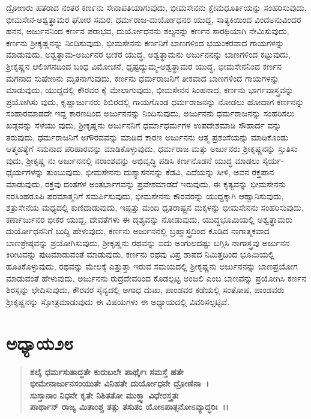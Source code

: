 ದ್ರೋಣರು ಹತರಾದ ನಂತರ ಕಣ೯ನು ಸೇನಾಪತಿಯಾಗುವುದು, ಭೀಮಸೇನನು ಕ್ಷೇಮಧೂರ್ತಿಯನ್ನು ಸಂಹರಿಸುವುದು, ಭೀಮಸೇನ-ಅಶ್ವತ್ಥಾಮರ ಘೋರ ಸಮರ, ಧರ್ಮರಾಜ-ದುರ್ಯೋಧನರ ಯುದ್ದ, ಸಾತ್ಯಕಿಯಿಂದ ವಿಂದಅನುವಿಂದರ ಹನನ, ಅರ್ಜುನನಿಂದ ಕರ್ಣನ ಪರಾಭವ, ದುರ್ಯೋಧನನು ಶಲ್ಯನನ್ನು ಕರ್ಣನ ಸಾರಥಿಯಾಗಿ ನೇಮಿಸುವುದು, ಕರ್ಣನು ಶ‍್ರೀಕೃಷ್ಣನನ್ನು ನಿಂದಿಸುವುದು, ಭೀಮಸೇನನು ಕರ್ಣನಿಗೆ ಬಾಣಗಳಿಂದ ಭಯಂಕರವಾದ ಗಾಯಗಳನ್ನು ಮಾಡುವುದು, ಅಶ್ವತ್ಥಾಮ-ಅರ್ಜುನರ ಭೀಕರ ಯುದ್ಧ, ಅಶ್ವತ್ಥಾಮನು ಅರ್ಜುನನನ್ನು ಬಾಣಗಳಿಂದ ಕಟ್ಟುವುದು, ಶ‍್ರೀಕೃಷ್ಣನ ಆಲಿಂಗನದಿಂದ ಬಂಧ ವಿಮೋಚನೆ, ಧೃಷ್ಟದ್ಯುಮ್ಮ-ಅಶ್ವತ್ಥಾಮರ ಯುದ್ಧ, ಭೀಮಸೇನನಿಂದ ಕರ್ಣನ ಮಗನಾದ ಸುಷೇಣನು ಮೃತನಾಗುವುದು, ಕರ್ಣನು ಧರ್ಮರಾಜನಿಗೆ ತೀಕವಾದ ಬಾಣಗಳಿಂದ ಗಾಯಗಳನ್ನು ಮಾಡುವುದು, ಯುದ್ದದಲ್ಲಿ ಕೌರವರ ಕೈ ಮೇಲಾಗುವುದು, ಭೀಮಸೇನನ ಸಿಂಹನಾದ, ಕರ್ಣನು ಭಾರ್ಗವಾಸ್ತ್ರವನ್ನು ಪ್ರಯೋಗಿಸು ವುದು, ಕೃಷ್ಣಾರ್ಜುನರು ಶಿಬಿರದಲ್ಲಿ ಗಾಯಗೊಂಡ ಧರ್ಮರಾಜನನ್ನು ನೋಡಲು ಹೋದಾಗ ಕರ್ಣನನ್ನು ಸಂಹಾರಮಾಡದೇ ಇದ್ದ ಕಾರಣದಿಂದ ಅರ್ಜುನನನ್ನು ನಿಂದಿಸುವುದು, ಅರ್ಜುನನು ಧರ್ಮರಾಜನನ್ನು ಸಂಹರಿಸಲು ಖಡ್ಗವನ್ನು ಸೆಳೆಯು ವುದು, ಶ‍್ರೀಕೃಷ್ಣನು ಅರ್ಜುನನಿಗೆ ಧರ್ಮಾಧರ್ಮಗಳ ಉಪದೇಶಮಾಡಿ ಸೌಹಾರ್ದ ವನ್ನು ತರುವುದು, ಧರ್ಮರಾಜನಿಗೆ ಅಗೌರವವನ್ನು ಮಾಡಿದ ಕಾರಣ ಅರ್ಜುನನು ಆತ್ಮ ಪ್ರಶಂಸೆಯನ್ನು ಮಾಡಿಕೊಂಡು ಆತ್ಮಹತ್ಯೆಗೆ ಸಮನಾದ ಪರಿಹಾರವನ್ನು ಮಾಡಿಕೊಳ್ಳುವುದು, ಧರ್ಮರಾಜ ಮತ್ತು ಅರ್ಜುನರು ಶ‍್ರೀಕೃಷ್ಣನನ್ನು ಸ್ತುತಿಸು ವುದು, ಶ‍್ರೀಕೃಷ್ಣ ನು ಅರ್ಜುನನಲ್ಲಿ ನರಾಂಶವನ್ನು ಅಭಿವೃದ್ಧಿ ಪಡಿಸಿ ಕರ್ಣನೊಡನೆ ಯುದ್ಧ ಮಾಡಲು ಸೈರ್ಯ-ಧೈರ್ಯಗಳನ್ನು ತುಂಬುವುದು, ಭೀಮಸೇನನು ದುಶ್ಯಾಸನನನ್ನು ಕೆಡವಿ, ಎದೆಯನ್ನು ಸೀಳಿ, ಅವನ ರಕ್ತಪಾನ ಮಾಡುವುದು, ರಕ್ತವು ದಂತಗಳ ಅಂತರ್ಭಾಗವನ್ನು ಪ್ರವೇಶಮಾಡದೆ ಇರುವುದು, ಈ ಕೃತ್ಯವನ್ನು ಭೀಮಸೇನನು ನರಸಿಂಹರೂಪಿ ಪರಮಾತ್ಮನಿಗೆ ಸಮರ್ಪಿಸುವುದು, ಭೀಮಸೇನನು ಕೌರವರನ್ನು ಯುದ್ದಕ್ಕಾಗಿ ಆಹ್ವಾನಿಸುವುದು, ಶತ್ರುಸೇನೆಯ ಮಧ್ಯದಲ್ಲಿ ಕುಣಿದಾಡುವುದು, ಇಪ್ಪತ್ತು ಮಂದಿ ಧೃತರಾಷ್ಟ್ರನ ಮಕ್ಕಳನ್ನು ಭೀಮಸೇನನು ಸಂಹರಿಸುವುದು, ಕರ್ಣಾರ್ಜುನರ ಭೀಕರ ಯುದ್ದ, ದೇವತೆಗಳು ಈ ದೃಶ್ಯವನ್ನು ನೋಡುವುದು, ಯುದ್ಧಭೂಮಿಯಲ್ಲಿ ಅಶ್ವತ್ಥಾಮರು ದುರ್ಯೋಧನನಿಗೆ ಬುದ್ದಿ ಹೇಳುವುದು, ಕರ್ಣನು ಅರ್ಜುನನಲ್ಲಿ ಬ್ರಹ್ಮಾಸ್ತ್ರದಿಂದ ಕೂಡಿದ ನಾಗಾತ್ಮಕವಾದ ಬಾಣಶ್ರೇಷ್ಠವನ್ನು ಪ್ರಯೋಗಿಸುವುದು, ಶ‍್ರೀಕೃಷ್ಣನು ರಥವನ್ನು ಐದು ಅಂಗುಲದಷ್ಟು ಬಗ್ಗಿಸಿ ನಾಗಾಸ್ತ್ರವು ಅರ್ಜುನನ ಕಿರೀಟವನ್ನು ಪುಡಿಮಾಡುವಂತೆ ಮಾಡುವುದು, ಕರ್ಣನು ರಥವು ವಿಪ್ರ ಶಾಪದ ನಿಮಿತ್ತದಿಂದ ಭೂಮಿಯಲ್ಲಿ ಹೂತಿಕೊಳ್ಳುವುದು, ರಥವನ್ನು ಮೇಲಕ್ಕೆ ಎತ್ತುತ್ತಾ ಇರುವ ಸಮಯದಲ್ಲಿ ಶ‍್ರೀಕೃಷ್ಣನು ಅರ್ಜುನನನ್ನು ಬಾಣಪ್ರಯೋಗ ಮಾಡುವಂತೆ ಹೇಳುವುದು, ಅರ್ಜುನನು ರುದ್ರದೇವರಿಂದ ಕೊಡಲ್ಪಟ್ಟ ಅಂಜಲಿ ಎಂಬ ಬಾಣವನ್ನು ಪ್ರಯೋಗಿಸಿ ಕರ್ಣನ ಶಿರಸ್ಸನ್ನು ಛೇದಿಸುವುದು, ಕೌರವರ ಸೈನ್ಯದಲ್ಲಿ ಅಗಾಧ ದುಃಖ, ಪಾಂಡವರ ಕಡೆಯಲ್ಲಿ ಸಂತೋಷ, ಪಾಂಡವರು ಶ‍್ರೀಕೃಷ್ಣನನ್ನು ಸ್ತೋತ್ರಮಾಡುವುದು ಈ ವಿಷಯಗಳು ಈ ಅಧ್ಯಾಯದಲ್ಲಿ ವಿವರಿಸಲ್ಪಟ್ಟಿವೆ.


\section*{ಅಧ್ಯಾಯ\enginline{-}೨೮}

\begin{verse}
\textbf{ಶಲೈ ಧರ್ಮಸುತಾದ್ಧತೇ ಕುರುಬಲೇ ಪಾರ್ಥೈಃ ಸಮಸ್ತೆ ಹತೇ}\\\textbf{ಭೀಮೇನಾರ್ಜುನಸಂಯುತೇ ವಿನಿಹತೇ ದುರ್ಯೋಧನೇ ದ್ರೋಣಿನಾ~।}\\\textbf{ಸುಸ್ತಾನಾಂ ನಿಧನೇ ಕೃತೇ ನಿಶಿತತೋ ಮುಕ್ತ್ವಾ ವಿಧೇರಸ್ತ್ರತಃ}\\\textbf{ಪಾರ್ಥಾನ್ ರಾಜ್ಯ ಮಿತಾಂಶ್ಚ ತತ್ಸು ತಸುತಂ ಯೋಽಪಾತ್ಸನೋಽವ್ಯಾದ್ಧರಿಃ~।।}
\end{verse}

